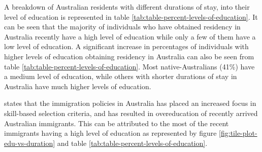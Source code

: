 \documentclass[11pt,a4paper,]{article}
\begin{document}
\begin{table}[H]

\caption{\label{tab:table-percent-levels-of-education}Percentages of Australian residents with different levels of education over each category of duration of stay}
\centering
{}
\end{table}

A breakdown of Australian residents with different durations of stay, into their level of education is represented in table \ref{tab:table-percent-levels-of-education}. It can be seen that the majority of individuals who have obtained residency in Australia recently have a high level of education while only a few of them have a low level of education. A significant increase in percentages of individuals with higher levels of education obtaining residency in Australia can also be seen from table \ref{tab:table-percent-levels-of-education}. Most native-Australians (41\%) have a medium level of education, while others with shorter durations of stay in Australia have much higher levels of education.

\textcite{green2007immigrant} states that the immigration policies in Australia has placed an increased focus in skill-based selection criteria, and has resulted in overeducation of recently arrived Australian immigrants. This can be attributed to the most of the recent immigrants having a high level of education as represented by figure \ref{fig:tile-plot-edu-vs-duration} and table \ref{tab:table-percent-levels-of-education}.
\end{document}
